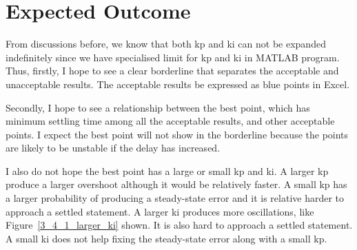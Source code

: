 \section{Expected Outcome} %
\label{section4.2}

From discussions before, we know that both kp and ki can not be expanded indefinitely since we have specialised limit for kp and ki in MATLAB program. Thus, firstly, I hope to see a clear borderline that separates the acceptable and unacceptable results. The acceptable results be expressed as blue points in Excel.  

Secondly, I hope to see a relationship between the best point, which has minimum settling time among all the acceptable results, and other acceptable points. I expect the best point will not show in the borderline because the points are likely to be unstable if the delay has increased.  

I also do not hope the best point has a large or small kp and ki. A larger kp produce a larger overshoot although it would be relatively faster. A small kp has a larger probability of producing a steady-state error and it is relative harder to approach a settled statement. A larger ki produces more oscillations, like Figure~\ref{3_4_1_larger_ki} shown. It is also hard to approach a settled statement. A small ki does not help fixing the steady-state error along with a small kp.  